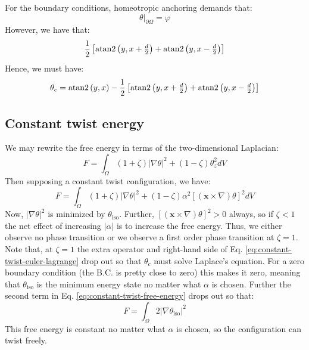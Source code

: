 \documentclass[reqno]{article}
\begin{document}
For the boundary conditions, homeotropic anchoring demands that:
\begin{equation}
    \left.\theta \right|_{\partial \Omega}
    =
    \varphi
\end{equation}
However, we have that:
\begin{equation}
    \frac12 \left[
        \operatorname{atan2} \left(y, x + \tfrac{d}{2}\right)
        + \operatorname{atan2} \left(y, x - \tfrac{d}{2}\right)
    \right]
\end{equation}
Hence, we must have:
\begin{equation}
    \theta_c
    =
    \operatorname{atan2} \left(y, x \right)
    -
    \frac12 \left[
        \operatorname{atan2} \left(y, x + \tfrac{d}{2}\right)
        + \operatorname{atan2} \left(y, x - \tfrac{d}{2}\right)
    \right]
\end{equation}

\subsection{Constant twist energy}

We may rewrite the free energy in terms of the two-dimensional Laplacian:
\begin{equation}
    F
    =
    \int_\Omega
    (1 + \zeta) \left| \nabla \theta \right|^2
    + (1 - \zeta) \theta_z^2 dV
\end{equation}
Then supposing a constant twist configuration, we have:
\begin{equation} \label{eq:constant-twist-free-energy}
    F
    =
    \int_\Omega
    (1 + \zeta) \left| \nabla \theta \right|^2
    + (1 - \zeta) \alpha^2 \left[ \left( \mathbf x \times \nabla \right) \theta \right]^2 dV
\end{equation}
Now, $\left| \nabla \theta \right|^2$ is minimized by $\theta_\text{iso}$.
Further, $\left[ (\mathbf x \times \nabla ) \theta \right]^2 >0$ always, so if $\zeta < 1$ the net effect of increasing $\left| \alpha \right|$ is to increase the free energy.
Thus, we either observe no phase transition or we observe a first order phase transition at $\zeta = 1$.
Note that, at $\zeta = 1$ the extra operator and right-hand side of Eq. \eqref{eq:constant-twist-euler-lagrange} drop out so that $\theta_c$ must solve Laplace's equation.
For a zero boundary condition (the B.C. is pretty close to zero) this makes it zero, meaning that $\theta_\text{iso}$ is the minimum energy state no matter what $\alpha$ is chosen.
Further the second term in Eq. \eqref{eq:constant-twist-free-energy} drops out so that:
\begin{equation}
    F
    =
    \int_\Omega 2 \left| \nabla \theta_\text{iso} \right|^2
\end{equation}
This free energy is constant no matter what $\alpha$ is chosen, so the configuration can twist freely.
\end{document}
